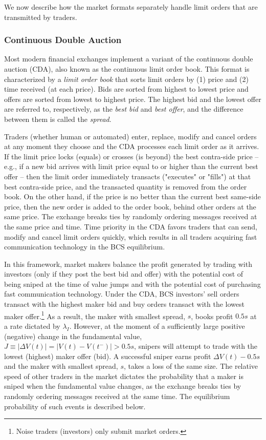 \documentclass[12pt]{article}
\begin{document}
We now describe how the market formats separately handle limit orders that are transmitted by traders.

\subsubsection{Continuous Double Auction}

Most modern financial exchanges implement a variant of the continuous double auction (CDA), also known as the continuous limit order book. This format is characterized by a \textit{limit order book} that sorts limit orders by (1) price and (2) time received (at each price). Bids are sorted from highest to lowest price and offers are sorted from lowest to highest price. The highest bid and the lowest offer are referred to, respectively, as the \textit{best bid} and \textit{best offer}, and the difference between them is called the \textit{spread}.

Traders (whether human or automated) enter, replace, modify and cancel orders at any moment they choose and the CDA processes each limit order as it arrives. If the limit price locks (equals) or crosses (is beyond) the best contra-side price -- e.g., if a new bid arrives with limit price equal to or higher than the current best offer -- then the limit order immediately transacts ("executes" or "fills") at that best contra-side price, and the transacted quantity is removed from the order book. On the other hand, if the price is no better than the current best same-side price, then the new order is added to the order book, behind other orders at the same price. The exchange breaks ties by randomly ordering messages received at the same price and time. Time priority in the CDA favors traders that can send, modify and cancel limit orders quickly, which results in all traders acquiring fast communication technology in the BCS equilibrium.

In this framework, market makers balance the profit generated by trading with investors (only if they post the best bid and offer) with the potential cost of being sniped at the time of value jumps and with the potential cost of purchasing fast communication technology. Under the CDA, BCS investors' sell orders transact with the highest maker bid and buy orders transact with the lowest maker offer.\footnote{Noise traders (investors) only submit market orders.} As a result, the maker with smallest spread, $s$, books profit $0.5s$ at a rate dictated by $\lambda_I$. However, at the moment of a sufficiently large positive (negative) change in the fundamental value, $J \equiv |\Delta V(t)| = |V(t)-V(t^-)| > 0.5s$, snipers will attempt to trade with the lowest (highest) maker offer (bid). A successful sniper earns profit $\Delta V(t) - 0.5s$ and the maker with smallest spread, $s$, takes a loss of the same size. The relative speed of other traders in the market dictates the probability that a maker is sniped when the fundamental value changes, as the exchange breaks ties by randomly ordering messages received at the same time. The equilibrium probability of such events is described below.
\end{document}
